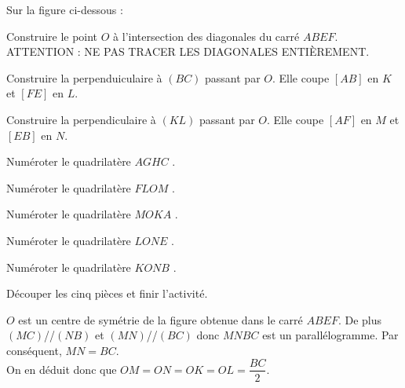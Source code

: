 \begin{activite}
    \pagebreak
    \vspace*{-15mm}
    Sur la figure ci-dessous : 
    \begin{itemize}
        \item Construire le point $O$ à l'intersection des diagonales du carré $ABEF$.\\ ATTENTION : NE PAS TRACER LES DIAGONALES ENTIÈREMENT.
        \item Construire la perpenduiculaire à $(BC)$ passant par $O$. Elle coupe $[AB]$ en $K$ et $[FE]$ en $L$.
        \item Construire la perpendiculaire à $(KL)$ passant par $O$. Elle coupe $[AF]$ en $M$ et $[EB]$ en $N$.
        \begin{minipage}{0.5\linewidth}
        \item Numéroter le quadrilatère $AGHC$ .
        \item Numéroter le quadrilatère $FLOM$ .
        \item Numéroter le quadrilatère $MOKA$ .
        \item Numéroter le quadrilatère $LONE$ .
        \item Numéroter le quadrilatère $KONB$ .
        \item Découper les cinq pièces et finir l'activité.
        \end{minipage}
        \begin{minipage}{0.5\linewidth}
        \end{minipage}
    \end{itemize}
    
    \begin{remarque}
        $O$ est un centre de symétrie de la figure obtenue dans le carré $ABEF$. De plus $(MC)$//$(NB)$ et $(MN)$//$(BC)$ donc $MNBC$ est un parallélogramme. 
        Par conséquent, $MN=BC$.\\ On en déduit donc que $OM=ON=OK=OL=\dfrac{BC}{2}$.
    \end{remarque}    
\end{activite}